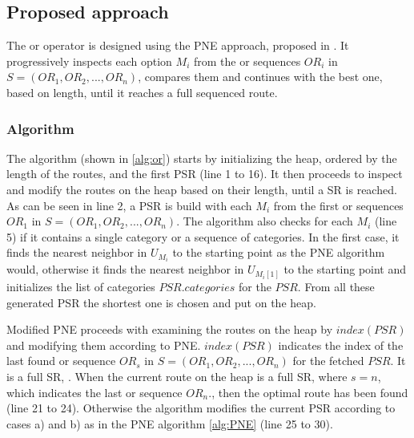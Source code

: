 
\subsection{Proposed approach} 
\label{sec:approachOr}
The or operator is designed using the PNE approach, proposed in \cite{OSR}. It progressively inspects each option $M_i$ from the or sequences $OR_i$ in $S = (OR_1, OR_2, ..., OR_n)$, compares them and continues with the best one, based on length, until it reaches a full sequenced route.

\subsubsection{Algorithm}
\label{sec:algortihmOr}
The algorithm (shown in \ref{alg:or}) starts by initializing the heap, ordered by the length of the routes, and the first PSR (line 1 to 16). It then proceeds to inspect and modify the routes on the heap based on their length, until a SR is reached. As can be seen in line 2, a PSR is build with each $M_i$ from the first or sequences $OR_1$ in $S = (OR_1, OR_2, ..., OR_n)$. The algorithm also checks for each $M_i$ (line 5) if it contains a single category or a sequence of categories. In the first case, it finds the nearest neighbor in $U_{M_i}$ to the starting point as the PNE algorithm would, otherwise it finds the nearest neighbor in $U_{M_i[1]}$ to the starting point and initializes the list of categories $PSR.categories$ for the $PSR$. From all these generated PSR the shortest one is chosen and put on the heap.

Modified PNE proceeds with examining the routes on the heap by $index(PSR)$ and modifying them according to PNE. $index(PSR)$ indicates the index of the last found or sequence $OR_s$ in $S = (OR_1, OR_2, ..., OR_n)$ for the fetched $PSR$. It is a full SR, . When the current route on the heap is a full SR, where $s = n$, which indicates the last or sequence $OR_n.$, then the optimal route has been found (line 21 to 24). Otherwise the algorithm modifies the current PSR according to cases a) and b) as in the PNE algorithm \ref{alg:PNE} (line 25 to 30). \newline

